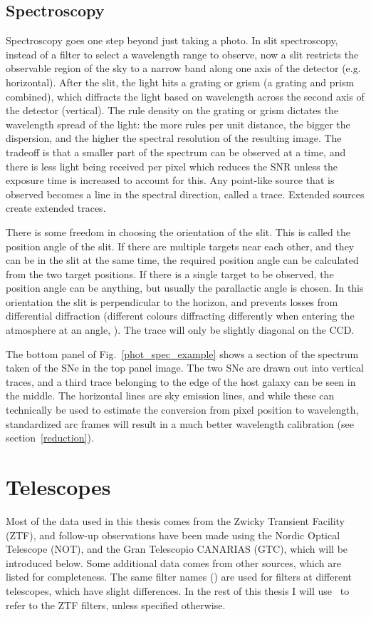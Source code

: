 \documentclass[a4paper,oneside,12pt, class=Latex/Classes/PhDthesisPSnPDF, crop=false]{standalone}
\begin{document}
\subsection{Spectroscopy}
Spectroscopy goes one step beyond just taking a photo. In slit spectroscopy, instead of a filter to select a wavelength range to observe, now a slit restricts the observable region of the sky to a narrow band along one axis of the detector (e.g. horizontal). After the slit, the light hits a grating or grism (a grating and prism combined), which diffracts the light based on wavelength across the second axis of the detector (vertical). The rule density on the grating or grism dictates the wavelength spread of the light: the more rules per unit distance, the bigger the dispersion, and the higher the spectral resolution of the resulting image. The tradeoff is that a smaller part of the spectrum can be observed at a time, and there is less light being received per pixel which reduces the SNR unless the exposure time is increased to account for this. Any point-like source that is observed becomes a line in the spectral direction, called a trace. Extended sources create extended traces.

There is some freedom in choosing the orientation of the slit. This is called the position angle of the slit. If there are multiple targets near each other, and they can be in the slit at the same time, the required position angle can be calculated from the two target positions. If there is a single target to be observed, the position angle can be anything, but usually the parallactic angle is chosen. In this orientation the slit is perpendicular to the horizon, and prevents losses from differential diffraction (different colours diffracting differently when entering the atmosphere at an angle, \citealt{diff_refrac_atmosphere}). The trace will only be slightly diagonal on the CCD.

The bottom panel of Fig.~\ref{phot_spec_example} shows a section of the spectrum taken of the SNe in the top panel image. The two SNe are drawn out into vertical traces, and a third trace belonging to the edge of the host galaxy can be seen in the middle. The horizontal lines are sky emission lines, and while these can technically be used to estimate the conversion from pixel position to wavelength, standardized arc frames will result in a much better wavelength calibration (see section~\ref{reduction}).


\section{Telescopes}
\label{telescopes}
Most of the data used in this thesis comes from the Zwicky Transient Facility (ZTF), and follow-up observations have been made using the Nordic Optical Telescope (NOT), and the Gran Telescopio CANARIAS (GTC), which will be introduced below. Some additional data comes from other sources, which are listed for completeness. The same filter names (\ztfg\ztfr\ztfi) are used for filters at different telescopes,  which have slight differences. In the rest of this thesis I will use \ztfg\ztfr\ztfi\ to refer to the ZTF filters, unless specified otherwise.
\end{document}
